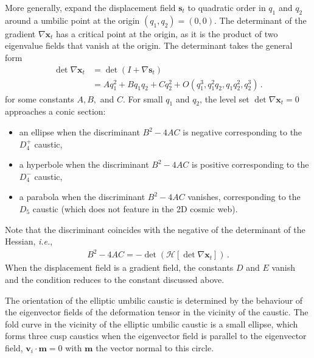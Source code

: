 \documentclass[a4paper, 11pt]{article}
\begin{document}
More generally, expand the displacement field $\bm{s}_t$ to quadratic order in $q_1$ and $q_2$ around a umbilic point at the origin $(q_1,q_2)=(0,0)$. The determinant of the gradient $\nabla \bm{x}_t$ has a critical point at the origin, as it is the product of two eigenvalue fields that vanish at the origin. The determinant takes the general form
\begin{align}
\det \nabla \bm{x}_t&=\det(I + \nabla \bm{s}_t)\nonumber\\
&= 
A q_1^2 + B q_1 q_2 + C q_2^2 + O(q_1^3,q_1^2 q_2,q_1 q_2^2,q_2^3)\,.
\end{align}
for some constants $A,B,$ and $C$.
For small $q_1$ and $q_2$, the level set $\det \nabla \bm{x}_t =0$ approaches a conic section:
\begin{itemize}
\item an ellipse when the discriminant $B^2 - 4AC$ is negative corresponding to the $D_4^+$ caustic,
\item a hyperbole when the discriminant $B^2 - 4AC$ is positive corresponding to the $D_4^-$ caustic,
\item a parabola when the discriminant $B^2 - 4AC$ vanishes, corresponding to the $D_5$ caustic (which does not feature in the 2D cosmic web).
\end{itemize}
Note that the discriminant coincides with the negative of the determinant of the Hessian, \textit{i.e.},
\begin{align}
B^2-4AC = -\det \left(\mathcal{H} \left[\det \nabla \bm{x}_t \right]\right)\,.
\end{align}
When the displacement field is a gradient field, the constants $D$ and $E$ vanish and the condition reduces to the constant discussed above.


The orientation of the elliptic umbilic caustic is determined by the behaviour of the eigenvector fields of the deformation tensor in the vicinity of the caustic. The fold curve in the vicinity of the elliptic umbilic caustic is a small ellipse, which forms three cusp caustics when the eigenvector field is parallel to the eigenvector field, $\bm{v}_i \cdot \bm{m} = 0$ with $\bm{m}$ the vector normal to this circle.
\end{document}
